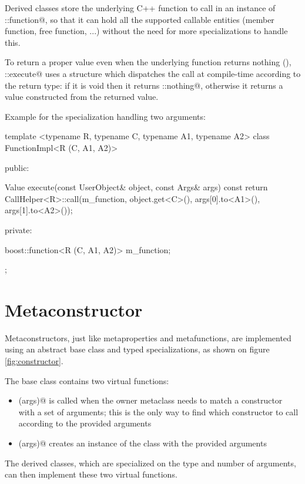 \documentclass[a4paper, twoside]{report}
\begin{document}
	Derived classes store the underlying C++ function to call in an instance of \verb@boost::function@, so that it can hold all the supported
	callable entities (member function, free function, ...) without the need for more specializations to handle this.
	
	To return a proper value even when the underlying function returns nothing (\verb@void@), \verb@FunctionImpl::execute@ uses a
	structure which dispatches the call at compile-time according to the return type: if it is void then it returns \verb@Value::nothing@,
	otherwise it returns a value constructed from the returned value.
	
	Example for the specialization handling two arguments:

\begin{cppcode}
template <typename R, typename C, typename A1, typename A2>
class FunctionImpl<R (C, A1, A2)>
{
public:

  Value execute(const UserObject& object, const Args& args) const
  {
    return CallHelper<R>::call(m_function, object.get<C>(),
                               args[0].to<A1>(), args[1].to<A2>());
  }

private:

  boost::function<R (C, A1, A2)> m_function;
};
\end{cppcode}


\chapter{Metaconstructor}

	Metaconstructors, just like metaproperties and metafunctions, are implemented using an abstract base class and
	typed specializations, as shown on figure \ref{fig:constructor}.

	The base class contains two virtual functions:
	\begin{itemize}
		\item \verb@matches(args)@ is called when the owner metaclass needs to match a constructor with a set of arguments; this is the only
		      way to find which constructor to call according to the provided arguments
		\item \verb@create(args)@ creates an instance of the class with the provided arguments
	\end{itemize}
	
	The derived classes, which are specialized on the type and number of arguments, can then implement these two virtual functions.
\end{document}
